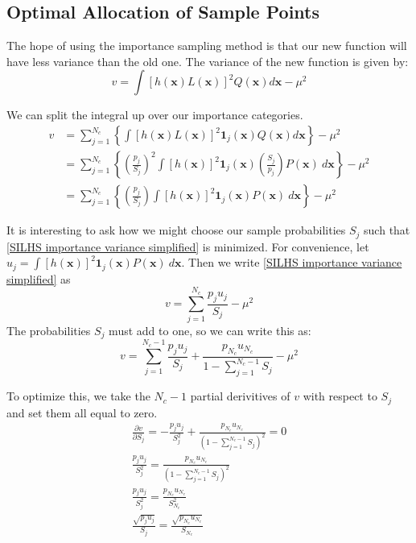 \documentclass[11pt,fleqn]{article}
\begin{document}
\subsection{Optimal Allocation of Sample Points}

The hope of using the importance sampling method is that our new function will
have less variance than the old one. The variance of the new function is given
by:
\begin{equation}
v = \int\left[h(\mathbf{x})L(\mathbf{x})\right]^2 Q(\mathbf{x})d\mathbf{x}
- \mu^2
\end{equation}

We can split the integral up over our importance categories.
\begin{align}
v &= \sum_{j=1}^{N_c} \left\{ \int\left[h(\mathbf{x})L(\mathbf{x})\right]^2
\mathbf{1}_j(\mathbf{x}) Q(\mathbf{x})
d\mathbf{x} \right\} - \mu^2 \\
&= \sum_{j=1}^{N_c} \left\{\left(\frac{p_j}{S_j}\right)^2
\int\left[h(\mathbf{x})\right]^2 \mathbf{1}_j(\mathbf{x})
\left(\frac{S_j}{p_j}\right) P(\mathbf{x})\ d\mathbf{x} \right\} - \mu^2 \\
&= \sum_{j=1}^{N_c} \left\{ \left(\frac{p_j}{S_j}\right)
\int\left[h(\mathbf{x})\right]^2\mathbf{1}_j(\mathbf{x}) P(\mathbf{x})\
d\mathbf{x} \right\} - \mu^2 \label{SILHS importance variance simplified}
\end{align}

It is interesting to ask how we might choose our sample probabilities $S_j$ such
that \eqref{SILHS importance variance simplified} is minimized. For convenience,
let $u_j=\int\left[h(\mathbf{x})\right]^2\mathbf{1}_j(\mathbf{x})P(\mathbf{x})\
d\mathbf{x}$. Then we write \eqref{SILHS importance variance simplified} as
\begin{equation}
v = \sum_{j=1}^{N_c} \frac{p_j u_j}{S_j} - \mu^2
\end{equation}
The probabilities $S_j$ must add to one, so we can write this as:
\begin{equation}
v = \sum_{j=1}^{N_c-1} \frac{p_j u_j}{S_j} + \frac{p_{N_c}
u_{N_c}}{1 - \sum_{j=1}^{N_c-1} S_j} - \mu^2
\end{equation}

To optimize this, we take the $N_c-1$ partial derivitives of $v$ with respect to
$S_j$ and set them all equal to zero.
\begin{gather}
\frac{\partial v}{\partial S_j} = -\frac{p_j u_j}{S_j^2} + \frac{p_{N_c}
u_{N_c}}{\left(1 - \sum_{j=1}^{N_c-1} S_j\right)^2} = 0 \\
\frac{p_j u_j}{S_j^2} = \frac{p_{N_c}
u_{N_c}}{\left(1 - \sum_{j=1}^{N_c-1} S_j\right)^2} \\
\frac{p_j u_j}{S_j^2} = \frac{p_{N_c}u_{N_c}}{S_{N_c}^2} \\
\frac{\sqrt{p_j u_j}}{S_j} = \frac{\sqrt{p_{N_c}u_{N_c}}}{S_{N_c}}
\end{gather}
\end{document}

